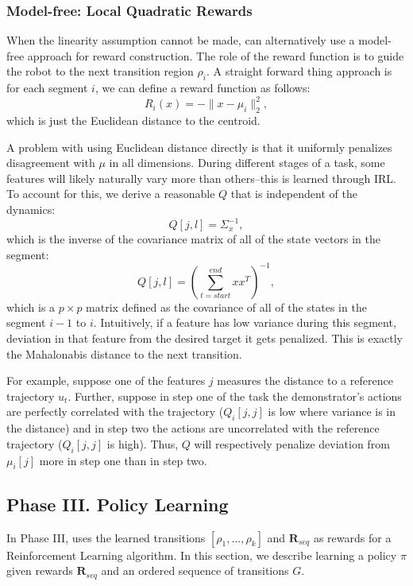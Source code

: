 \vspace{-15pt}
\subsubsection{Model-free: Local Quadratic Rewards}
When the linearity assumption cannot be made, \hirl can alternatively use a model-free approach for reward construction.
The role of the reward function is to guide the robot to the next transition region $\rho_i$.
A straight forward thing approach is for each segment $i$, we can define a reward function as follows:
\[
R_i(x) = -\|x - \mu_{i}\|_2^2, 
\]
which is just the Euclidean distance to the centroid.

A problem with using Euclidean distance directly is that it uniformly penalizes disagreement with $\mu$ in all dimensions.
During different stages of a task, some features will likely naturally vary more than others--this is learned through IRL.
To account for this, we derive a reasonable $Q$ that is independent of the dynamics:
\[
Q[j,l] = \Sigma^{-1}_x,
\]
which is the inverse of the covariance matrix of all of the state vectors in the segment:
\begin{equation}
Q[j,l] = (\sum_{t=start}^{end} x x^T)^{-1},
\label{localq}
\end{equation}
which is a $p \times p$ matrix defined as the covariance of all of the states in the segment $i-1$ to $i$.
Intuitively, if a feature has low variance during this segment, deviation in that feature from the desired target it gets penalized. 
This is exactly the Mahalonabis distance to the next transition. 

For example, suppose one of the features $j$ measures the distance to a reference trajectory $u_t$. 
Further, suppose in step one of the task the demonstrator's actions are perfectly correlated with the trajectory ($Q_{i}[j,j]$ is low where variance is in the distance) and in step two the actions are uncorrelated with the reference trajectory ($Q_{i}[j,j]$ is high).
Thus, $Q$ will respectively penalize deviation from $\mu_{i}[j]$ more in step one than in step two.


\subsection*{Phase III. Policy Learning}

In Phase III, \hirl uses the learned transitions $[\rho_1,...,\rho_k]$ and $\mathbf{R}_{seq}$ as rewards for a Reinforcement Learning algorithm.
In this section, we describe learning a policy $\pi$ given rewards $\mathbf{R}_{seq}$ and an ordered sequence of transitions $G$.


